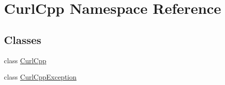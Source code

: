 \hypertarget{namespace_curl_cpp}{}\section{Curl\+Cpp Namespace Reference}
\label{namespace_curl_cpp}
\subsection*{Classes}
\begin{DoxyCompactItemize}
\item 
class \hyperlink{class_curl_cpp_1_1_curl_cpp}{Curl\+Cpp}
\item 
class \hyperlink{class_curl_cpp_1_1_curl_cpp_exception}{Curl\+Cpp\+Exception}
\end{DoxyCompactItemize}
